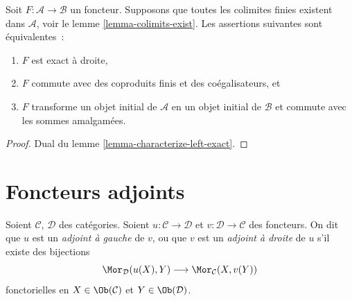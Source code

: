 \begin{lemma}
\label{lemma-characterize-right-exact}
Soit $F : \mathcal{A} \to \mathcal{B}$ un foncteur. Supposons que toutes les
colimites finies existent dans $\mathcal{A}$, voir le lemme
\ref{lemma-colimits-exist}. Les assertions suivantes sont équivalentes :
\begin{enumerate}
\item $F$ est exact à droite,
\item $F$ commute avec des coproduits finis et des coégalisateurs, et
\item $F$ transforme un objet initial de $\mathcal{A}$ en un objet initial de
$\mathcal{B}$ et commute avec les sommes amalgamées.
\end{enumerate}
\end{lemma}

\begin{proof}
Dual du lemme \ref{lemma-characterize-left-exact}.
\end{proof}




\section{Foncteurs adjoints}
\label{section-adjoint}

\begin{definition}
\label{definition-adjoint}
Soient $\mathcal{C}$, $\mathcal{D}$ des catégories. Soient $u : \mathcal{C} \to \mathcal{D}$ et $v : \mathcal{D} \to \mathcal{C}$ des foncteurs. On dit que
$u$ est un {\it adjoint à gauche} de $v$, ou que $v$ est un {\it adjoint à droite}
de $u$ s'il existe des bijections
$$
\Mor_\mathcal{D}(u(X), Y)
\longrightarrow
\Mor_\mathcal{C}(X, v(Y))
$$
fonctorielles en $X \in \Ob(\mathcal{C})$ et $Y \in \Ob(\mathcal{D})$.
\end{definition}

